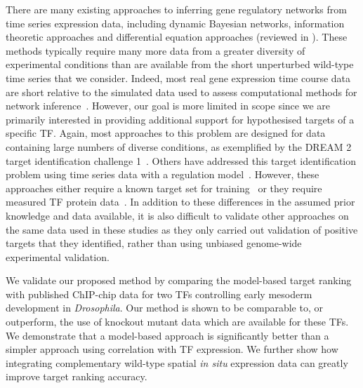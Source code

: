 \documentclass{pnastwo}
\begin{document}
\begin{article}
There are many existing approaches to inferring gene regulatory networks from
time series expression data, including dynamic Bayesian networks,
information theoretic approaches and differential equation approaches
(reviewed in \cite{Bansal2007a}). These methods typically require many
more data from a greater diversity of experimental conditions than are
available from the short unperturbed wild-type time series that we
consider. Indeed, most real gene expression time course data are short
relative to the simulated data used to assess computational methods
for network inference~\cite{Ernst2005}. However, our goal is more limited in scope since
we are primarily interested in providing additional support for hypothesised
targets of a specific TF. Again, most approaches to this problem are
designed for data containing large numbers of diverse conditions, as
exemplified by the DREAM 2 target identification
challenge 1~\cite{Stolovitzky2007}. Others
have addressed this target identification problem using time series
data with a regulation model~\cite{Barenco2006a,Gatta2008}. However,
these approaches either require a known target set for training~\cite{Barenco2006a} or
they require measured TF protein data~\cite{Gatta2008}. In addition to
these differences in the assumed prior knowledge and data available,
it is also difficult to validate other approaches on the same data used in these
studies as they only carried out validation of positive targets
that they identified, rather than using unbiased genome-wide
experimental validation. 

We validate our proposed method by comparing the model-based target
ranking with published ChIP-chip data for two TFs controlling early
mesoderm development in \emph{Drosophila}. Our method is shown to be comparable
to, or outperform, the use of knockout mutant data which are available
for these TFs. We demonstrate that a model-based approach is significantly
better than a simpler approach using correlation with TF
expression. We further show how integrating complementary wild-type spatial
{\em in situ} expression data can greatly improve target ranking accuracy. 


\end{article}
\end{document}
